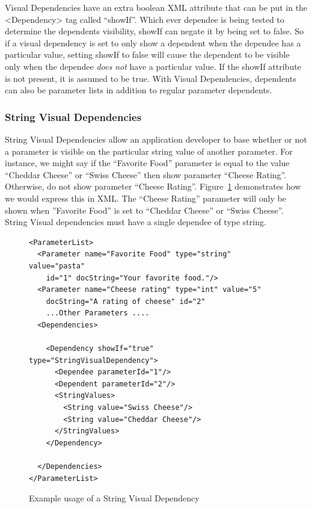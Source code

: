 Visual Dependencies have an extra boolean XML attribute that can be put in the <Dependency> tag called ``showIf''. Which ever dependee is being tested to 
determine the dependents visibility, showIf can negate it by being set to false. So if a visual dependency is set to only show a dependent when the
dependee has a particular value, setting showIf to false will cause the dependent to be visible only when the dependee \emph{does not} have a particular
value. If the showIf attribute is not present, it is assumed to be true. With Visual Dependencies, dependents can also be parameter lists in addition to regular
parameter dependents.

\subsubsection{String Visual Dependencies}
String Visual Dependencies allow an application developer to base whether or not a parameter is visible on the particular string value of another
parameter. For instance, we might say if the ``Favorite Food'' parameter  is equal to the value ``Cheddar Cheese'' or ``Swiss Cheese'' then show parameter ``Cheese Rating''. 
Otherwise, do not show parameter ``Cheese Rating''. Figure~\ref{StringVisXML} demonstrates how we would express this in XML. The 
``Cheese Rating'' parameter will only be shown when ''Favorite Food'' is set to ``Cheddar Cheese'' or ``Swiss Cheese''. String Visual dependencies must have a single 
dependee of type string. 
\begin{figure}
\centering
{\footnotesize
\begin{Verbatim}
<ParameterList>
  <Parameter name="Favorite Food" type="string" value="pasta"
    id="1" docString="Your favorite food."/>
  <Parameter name="Cheese rating" type="int" value="5"
    docString="A rating of cheese" id="2"
    ...Other Parameters ....
  <Dependencies>

    <Dependency showIf="true" type="StringVisualDependency">
      <Dependee parameterId="1"/>
      <Dependent parameterId="2"/>
      <StringValues>
        <String value="Swiss Cheese"/>
        <String value="Cheddar Cheese"/>
      </StringValues>
    </Dependency>

  </Dependencies>
</ParameterList>
\end{Verbatim}
}
\caption{Example usage of a String Visual Dependency}
\label{StringVisXML}
\end{figure}

